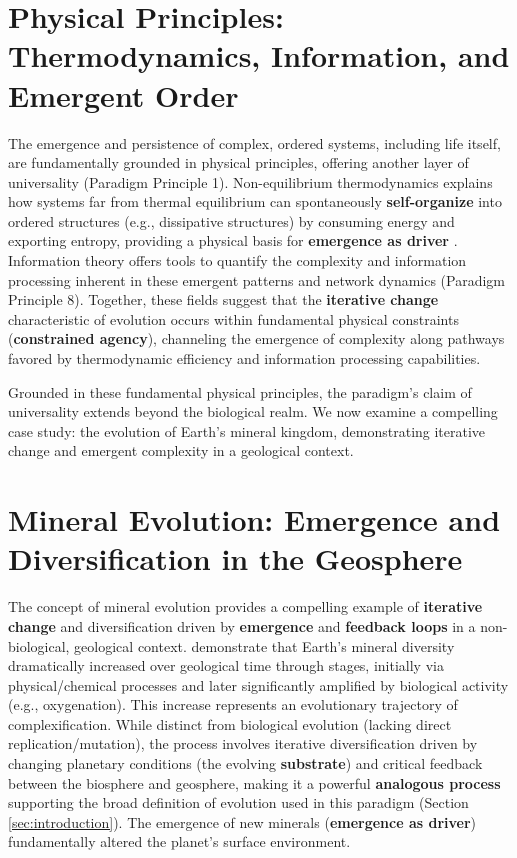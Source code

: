 \section{Physical Principles: Thermodynamics, Information, and Emergent Order} \label{sec:thermoinfo}
The emergence and persistence of complex, ordered systems, including life itself, are fundamentally grounded in physical principles, offering another layer of universality (Paradigm Principle 1). Non-equilibrium thermodynamics explains how systems far from thermal equilibrium can spontaneously \textbf{self-organize} into ordered structures (e.g., dissipative structures) by consuming energy and exporting entropy, providing a physical basis for \textbf{emergence as driver} \citep{peng2021nonequilibrium,koonin2022thermo}. Information theory offers tools to quantify the complexity and information processing inherent in these emergent patterns and network dynamics (Paradigm Principle 8). Together, these fields suggest that the \textbf{iterative change} characteristic of evolution occurs within fundamental physical constraints (\textbf{constrained agency}), channeling the emergence of complexity along pathways favored by thermodynamic efficiency and information processing capabilities.

Grounded in these fundamental physical principles, the paradigm's claim of universality extends beyond the biological realm. We now examine a compelling case study: the evolution of Earth's mineral kingdom, demonstrating iterative change and emergent complexity in a geological context.

\section{Mineral Evolution: Emergence and Diversification in the Geosphere} \label{sec:minerals}
The concept of mineral evolution provides a compelling example of \textbf{iterative change} and diversification driven by \textbf{emergence} and \textbf{feedback loops} in a non-biological, geological context. \citet{hazen2008mineral} demonstrate that Earth's mineral diversity dramatically increased over geological time through stages, initially via physical/chemical processes and later significantly amplified by biological activity (e.g., oxygenation). This increase represents an evolutionary trajectory of complexification. While distinct from biological evolution (lacking direct replication/mutation), the process involves iterative diversification driven by changing planetary conditions (the evolving \textbf{substrate}) and critical feedback between the biosphere and geosphere, making it a powerful \textbf{analogous process} supporting the broad definition of evolution used in this paradigm (Section \ref{sec:introduction}). The emergence of new minerals (\textbf{emergence as driver}) fundamentally altered the planet's surface environment.

